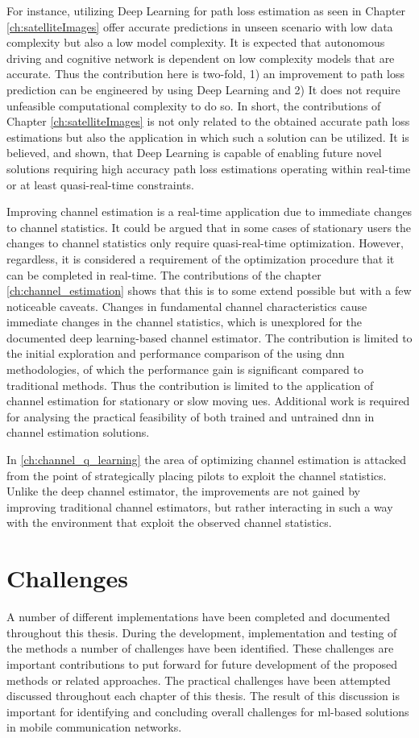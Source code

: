 For instance, utilizing Deep Learning for path loss estimation as seen in Chapter \ref{ch:satelliteImages} offer accurate predictions in unseen scenario with low data complexity but also a low model complexity. It is expected that autonomous driving and cognitive network is dependent on low complexity models that are accurate. Thus the contribution here is two-fold, 1) an improvement to path loss prediction can be engineered by using Deep Learning and 2) It does not require unfeasible computational complexity to do so. In short, the contributions of Chapter \ref{ch:satelliteImages} is not only related to the obtained accurate path loss estimations but also the application in which such a solution can be utilized. It is believed, and shown, that Deep Learning is capable of enabling future novel solutions requiring high accuracy path loss estimations operating within real-time or at least quasi-real-time constraints. 

Improving channel estimation is a real-time application due to immediate changes to channel statistics. It could be argued that in some cases of stationary users the changes to channel statistics only require quasi-real-time optimization. However, regardless, it is considered a requirement of the optimization procedure that it can be completed in real-time. The contributions of the chapter \ref{ch:channel_estimation} shows that this is to some extend possible but with a few noticeable caveats. Changes in fundamental channel characteristics cause immediate changes in the channel statistics, which is unexplored for the documented deep learning-based channel estimator. The contribution is limited to the initial exploration and performance comparison of the using \gls{dnn} methodologies, of which the performance gain is significant compared to traditional methods. Thus the contribution is limited to the application of channel estimation for stationary or slow moving \glspl{ue}. Additional work is required for analysing the practical feasibility of both trained and untrained \gls{dnn} in channel estimation solutions.

In \ref{ch:channel_q_learning} the area of optimizing channel estimation is attacked from the point of strategically placing pilots to exploit the channel statistics. Unlike the deep channel estimator, the improvements are not gained by improving traditional channel estimators, but rather interacting in such a way with the environment that exploit the observed channel statistics. 


\section{Challenges}
A number of different implementations have been completed and documented throughout this thesis. During the development, implementation and testing of the methods a number of challenges have been identified. These challenges are important contributions to put forward for future development of the proposed methods or related approaches. The practical challenges have been attempted discussed throughout each chapter of this thesis. The result of this discussion is important for identifying and concluding overall challenges for \gls{ml}-based solutions in mobile communication networks.


